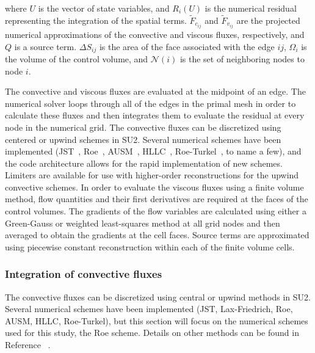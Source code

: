 where $U$ is the vector of state variables, and $R_i(U)$ is the numerical residual representing the integration of the spatial terms. $\tilde{F}_{c_{ij}}$ and $\tilde{F}_{v_{ij}}$ are the projected numerical approximations of the convective and viscous fluxes, respectively, and $Q$ is a source term. $\Delta{S}_{ij}$ is the area of the face associated with the edge $ij$, $\Omega_i$ is the volume of the control volume, and $\mathcal{N}(i)$ is the set of neighboring nodes to node $i$.

The convective and viscous fluxes are evaluated at the midpoint of an edge. The numerical solver loops through all of the edges in the primal mesh in order to calculate these fluxes and then integrates them to evaluate the residual at every node in the numerical grid. The convective fluxes can be discretized using centered or upwind schemes in SU2. Several numerical schemes have been implemented (JST~\cite{jameson1981}, Roe~\cite{roe1981}, AUSM~\cite{liou93}, HLLC~\cite{toro1999}, Roe-Turkel~\cite{turkel_1}, to name a few), and the code architecture allows for the rapid implementation of new schemes. Limiters are available for use with higher-order reconstructions for the upwind convective schemes. In order to evaluate the viscous fluxes using a finite volume method, flow quantities and their first derivatives are required at the faces of the control volumes. The gradients of the flow variables are calculated using either a Green-Gauss or weighted least-squares method at all grid nodes and then averaged to obtain the gradients at the cell faces. Source terms are approximated using piecewise constant reconstruction within each of the finite volume cells.

\subsubsection*{Integration of convective fluxes}

The convective fluxes can be discretized using central or upwind methods in SU2. Several numerical schemes have been implemented (JST, Lax-Friedrich, Roe, AUSM, HLLC, Roe-Turkel), but this section will focus on the numerical schemes used for this study, the Roe scheme. Details on other methods can be found in Reference ~.

